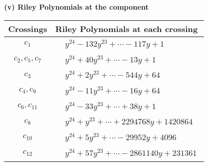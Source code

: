 \documentclass[1p]{elsarticle_modified}
\theoremstyle{definition}
\begin{document}
\newpage\renewcommand{\arraystretch}{1}
\flushleft \textbf{(v) Riley Polynomials at the component}\newline \\
\begin{tabular}{m{50pt}|m{274pt}}
Crossings & \hspace{64pt}Riley Polynomials at each crossing \\
\hline $$\begin{aligned}c_{1}\end{aligned}$$&$\begin{aligned}
&y^{24}-132 y^{23}+\cdots-117 y+1
\end{aligned}$\\
\hline $$\begin{aligned}c_{2},c_{5},c_{7}\end{aligned}$$&$\begin{aligned}
&y^{24}+40 y^{23}+\cdots-13 y+1
\end{aligned}$\\
\hline $$\begin{aligned}c_{3}\end{aligned}$$&$\begin{aligned}
&y^{24}+2 y^{23}+\cdots-544 y+64
\end{aligned}$\\
\hline $$\begin{aligned}c_{4},c_{9}\end{aligned}$$&$\begin{aligned}
&y^{24}-11 y^{23}+\cdots-16 y+64
\end{aligned}$\\
\hline $$\begin{aligned}c_{6},c_{11}\end{aligned}$$&$\begin{aligned}
&y^{24}-33 y^{23}+\cdots+38 y+1
\end{aligned}$\\
\hline $$\begin{aligned}c_{8}\end{aligned}$$&$\begin{aligned}
&y^{24}+y^{23}+\cdots+2294768 y+1420864
\end{aligned}$\\
\hline $$\begin{aligned}c_{10}\end{aligned}$$&$\begin{aligned}
&y^{24}+5 y^{23}+\cdots-29952 y+4096
\end{aligned}$\\
\hline $$\begin{aligned}c_{12}\end{aligned}$$&$\begin{aligned}
&y^{24}+57 y^{23}+\cdots-2861140 y+231361
\end{aligned}$\\
\hline
\end{tabular}\\~\\
\end{document}
